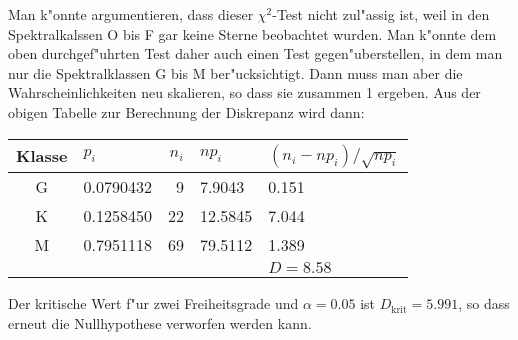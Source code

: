 \begin{diskussion}
Man k"onnte argumentieren, dass dieser $\chi^2$-Test nicht zul"assig ist,
weil in den Spektralkalssen O bis F gar keine Sterne beobachtet wurden.
Man k"onnte dem oben durchgef"uhrten Test daher auch einen Test
gegen"uberstellen, in dem man nur die Spektralklassen G bis M ber"ucksichtigt.
Dann muss man aber die Wahrscheinlichkeiten neu skalieren, so dass sie
zusammen 1 ergeben.
Aus der obigen Tabelle zur Berechnung der Diskrepanz wird dann:
\begin{center}
\begin{tabular}{|c|l|r|l|l|}
\hline
Klasse&$p_i$    &$n_i$&$np_i$            &$(n_i-np_i)/\sqrt{np_i}$\\
\hline
   G  &0.0790432&    9&\phantom{0}7.9043 & 0.151\phantom{882     }\\
   K  &0.1258450&   22&12.5845           & 7.044\phantom{503     }\\
   M  &0.7951118&   69&79.5112           & 1.389\phantom{552     }\\
\hline
      &         &     &                  &$D=8.58$\\
\hline
\end{tabular}
\end{center}
%
%
Der kritische Wert f"ur zwei Freiheitsgrade und $\alpha=0.05$ ist
$D_{\text{krit}}=5.991$,
so dass erneut die Nullhypothese verworfen werden kann.
\end{diskussion}




